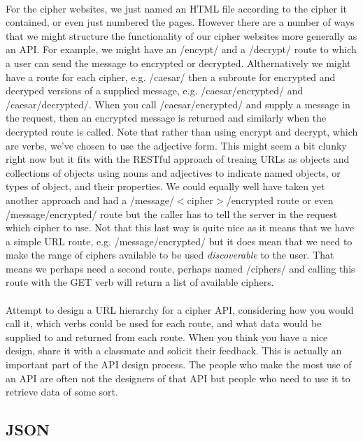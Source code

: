 \documentclass[10pt, a4paper, twosize]{article}
\begin{document}
\paragraph{} For the cipher websites, we just named an HTML file according to the cipher it contained, or even just numbered the pages. However there are a number of ways that we might structure the functionality of our cipher websites more generally as an API. For example, we might have an /encypt/ and a /decrypt/ route to which a user can send the message to encrypted or decrypted. Althernatively we might have a route for each cipher, e.g. /caesar/ then a subroute for encrypted and decryped versions of a supplied message, e.g. /caesar/encrypted/ and /caesar/decrypted/. When you call /caesar/encrypted/ and supply a message in the request, then an encrypted message is returned and similarly when the decrypted route is called. Note that rather than using encrypt and decrypt, which are verbs, we've chosen to use the adjective form. This might seem a bit clunky right now but it fits with the RESTful approach of treaing URLs as objects and collections of objects using nouns and adjectives to indicate named objects, or types of object, and their properties. We could equally well have taken yet another approach and had a /message/$<$cipher$>$/encrypted route or even /message/encrypted/ route but the caller has to tell the server in the request which cipher to use. Not that this last way is quite nice as it means that we have a simple URL route, e.g. /message/encrypted/ but it does mean that we need to make the range of ciphers available to be used \emph{discoverable} to the user. That means we perhaps need a second route, perhaps named /ciphers/ and calling this route with the GET verb will return a list of available ciphers.

\paragraph{} Attempt to design a URL hierarchy for a cipher API, considering how you would call it, which verbs could be used for each route, and what data would be supplied to and returned from each route. When you think you have a nice design, share it with a classmate and solicit their feedback. This is actually an important part of the API design process. The people who make the most use of an API are often not the designers of that API but people who need to use it to retrieve data of some sort.

\subsection{JSON}
\end{document}

